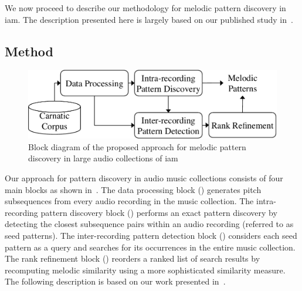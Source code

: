 We now proceed to describe our methodology for melodic pattern discovery in \gls{iam}. The description presented here is largely based on our published study in~\cite{gulati_SITIS_2014}. 


\subsection{Method}
\label{sec:patterns_discovery_method}

\begin{figure}
	\begin{center}
		\includegraphics[width=\figSizeEightyFive]{ch06_patterns/figures/discovery/blockDiagram_Overall.pdf}
	\end{center}
	\caption{Block diagram of the proposed approach for melodic pattern discovery in large audio collections of \gls{iam}}
	\label{fig:pattern_discovery_overall_block_diagram}
\end{figure}

Our approach for pattern discovery in audio music collections consists of four main blocks as shown in~. The data processing block () generates pitch subsequences from every audio recording in the music collection. The intra-recording pattern discovery block () performs an exact pattern discovery by detecting the closest subsequence pairs within an audio recording (referred to as seed patterns). The inter-recording pattern detection block () considers each seed pattern as a query and searches for its occurrences in the entire music collection. The rank refinement block () reorders a ranked list of search results by recomputing melodic similarity using a more sophisticated similarity measure. The following description is based on our work presented in~\cite{gulati_SITIS_2014}.

